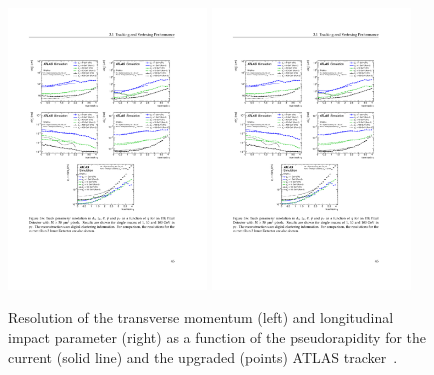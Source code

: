\begin{figure}[t]
\begin{center}
  \includegraphics[width=0.47\textwidth]{figures/atlas-tdr-030-fig3-6e.pdf}
  \includegraphics[width=0.47\textwidth]{figures/atlas-tdr-030-fig3-6b.pdf}
  \caption{Resolution of the transverse momentum (left) and longitudinal impact parameter (right) as a function of the pseudorapidity for the current (solid line) and the upgraded (points) ATLAS tracker~\cite{Collaboration:2285585}.}
  \label{fig:atlastrackres}
\end{center}
\end{figure}

